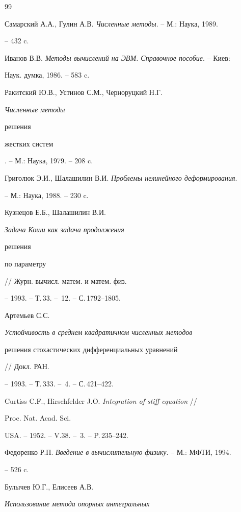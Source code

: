 \begin{thebibliography}{99} 


 




Самарский А.А., Гулин А.В. {\em Численные методы}. -- М.: Наука, 1989. 


-- 432 c. 




Иванов В.В. {\em Методы вычислений на ЭВМ. Справочное пособие}. -- Киев: 


Наук. думка, 1986. -- 583 c. 




Ракитский Ю.В., Устинов С.М., Черноруцкий Н.Г. {\em Численные методы 


решения 


жестких систем}. -- М.: Наука, 1979. -- 208 c. 




Григолюк Э.И., Шалашилин В.И. {\em Проблемы нелинейного деформирования}. 


-- М.: Наука, 1988. -- 230 c. 




Кузнецов Е.Б., Шалашилин В.И. {\em Задача Коши как задача продолжения 


решения 


по параметру} // Журн. вычисл. матем. и матем. физ. 


-- 1993. -- Т.\,33. -- \No\,12. -- С.\,1792--1805. 




Артемьев С.С. {\em Устойчивость в среднем квадратичном численных методов 


решения стохастических дифференциальных уравнений} // Докл. РАН. 


-- 1993. -- Т.\,333. -- \No\,4. -- С.\,421--422. 




Curtiss C.F., Hirschfelder J.O. {\em Integration of stiff equation} // 


Proc. Nat. Acad. Sci. 


USA. -- 1952. -- V.38. -- \No\,3. -- P.\,235--242. 




Федоренко Р.П. {\em Введение в вычислительную физику}. -- М.: МФТИ, 1994. 


-- 526 c. 




Булычев Ю.Г., Елисеев А.В. {\em Использование метода опорных интегральных 


}
\end{thebibliography}

